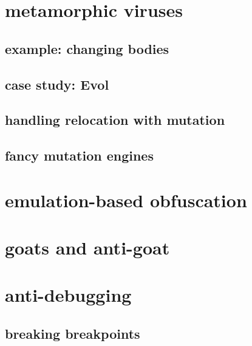 \date{}
\title{}
\date{}

\begin{frame}
    \titlepage
\end{frame}




\section{metamorphic viruses}


\subsection{example: changing bodies}


\subsection{case study: Evol}


\subsection{handling relocation with mutation}


\subsection{fancy mutation engines}


\section{emulation-based obfuscation}


\section{goats and anti-goat}


\section{anti-debugging}


\subsection{breaking breakpoints}

